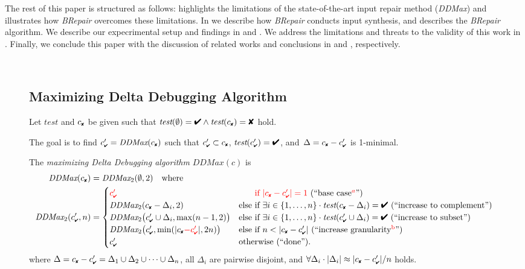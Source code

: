 \documentclass[sigconf,review,anonymous]{acmart}
\newcounter{todocounter}
\newcommand{\todo}[1]{\marginpar{$|$}\textcolor{red}{\stepcounter{todocounter}\footnote[\thetodocounter]{\textcolor{red}{\textbf{TODO }}\textit{#1}}}}
\renewcommand{\todo}[1]{}
\newcommand{\test}{\textit{test}\xspace}
\newcommand{\pass}{\text{\ding{52}}\xspace}
\newcommand{\fail}{\text{\ding{56}}\xspace}
\newcommand{\cfail}{{c_{\scriptscriptstyle \fail}}}
\newcommand{\dpass}{{c'_{\scriptscriptstyle \pass}}}
\newcommand{\ddmax}{\textit{DDMax}\xspace}
\newcommand{\brepair}{\textit{BRepair}\xspace}
\begin{document}
The rest of this paper is structured as follows:  highlights the limitations of the state-of-the-art input repair method (\ddmax) and illustrates how \brepair overcomes these limitations. In  we describe how \brepair conducts input synthesis, and   describes the \brepair algorithm. We describe our expecrimental setup and findings in  and . We address the limitations and threats to the validity of this work in 
. Finally, we conclude this paper with the discussion of related works and conclusions in  and , respectively.



\begin{figure*}[t]
\begin{boxedminipage}{\textwidth}
\smallskip
\ \begin{minipage}{0.9\textwidth}
\subsection*{Maximizing Delta Debugging Algorithm}
\medskip

Let $\test$ and $\cfail$ be given such that $\test(\emptyset) = \pass \land
\test(\cfail) = \fail$ hold.

The goal is to find $\dpass = \ddmax(\cfail)$ such that $\dpass \subset \cfail$, $\test(\dpass) = \pass$, and~$\Delta = \cfail - \dpass$ is 1-minimal.

The \emph{maximizing Delta Debugging algorithm} $\ddmax(c)$ is
\begin{align*}
\ddmax(\cfail) &= \ddmax_2(\emptyset, 2) \quad \text{where} \\
\ddmax_2(\dpass, n) &=
\begin{cases}
  \textcolor{red}{\dpass} & \text{\textcolor{red}{\hphantom{else }if $|\cfail - \dpass| = 1$} (``base case$^{\textcolor{red}{a}}$'')} \\
%
\ddmax_2(\cfail - \Delta_i, 2) & \text{else if $\exists i \in \{1, \dots, n\} \cdot \test(\cfail - \Delta_i) = \pass$ (``increase to complement'')} \\
%
\ddmax_2\bigl(\dpass \cup \Delta_i, \max(n - 1, 2)\bigr) &
\text{else if $\exists i \in \{1, \dots, n\} \cdot \test(\dpass \cup \Delta_i) = \pass$ (``increase to subset'')} \\
%
  \ddmax_2\bigl(\dpass, \min(|\cfail \textcolor{red}{- \dpass}|, 2n)\bigr) & \text{else if $n < |\cfail - \dpass|$ (``increase granularity$^{\text{\textcolor{red}{b}}}$'')} \\
\dpass & \text{otherwise (``done'').}
\end{cases}
\end{align*}
where $\Delta = \cfail - \dpass = \Delta_1 \cup \Delta_2 \cup \dots \cup \Delta_n$, all
$\Delta_i$ are pairwise disjoint, and $\forall \Delta_i \cdot |\Delta_i| \approx |\cfail - \dpass| / n$
holds.


\end{minipage}
\end{boxedminipage}
\end{figure*}
\end{document}
